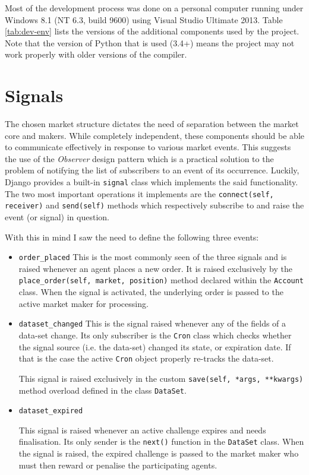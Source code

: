 \documentclass[bsc,frontabs,twoside,singlespacing,parskip,deptreport]{infthesis}     %
\begin{document}
	Most of the development process was done on a personal computer running under Windows 8.1 (NT 6.3, build 9600) using Visual Studio Ultimate 2013. Table \ref{tab:dev-env} lists the versions of the additional components used by the project. Note that the version of Python that is used (3.4+) means the project may not work properly with older versions of the compiler. 

\section{Signals}

	The chosen market structure dictates the need of separation between the market core and makers. While completely independent, these components should be able to communicate effectively in response to various market events. This suggests the use of the {\em Observer} design pattern which is a practical solution to the problem of notifying the list of subscribers to an event of its occurrence. Luckily, Django provides a built-in {\tt signal} class which implements the said functionality. The two most important operations it implements are the {\tt connect(self, receiver)} and {\tt send(self)} methods which respectively subscribe to and raise the event (or signal) in question. 

	With this in mind I saw the need to define the following three events:
\begin{itemize}
\item {\tt order\_placed}
	This is the most commonly seen of the three signals and is raised whenever an agent places a new order. It is raised exclusively by the {\tt place\_order(self, market, position)} method declared within the {\tt Account} class. When the signal is activated, the underlying order is passed to the active market maker for processing. 

\item {\tt dataset\_changed}
	This is the signal raised whenever any of the fields of a data-set change. Its only subscriber is the {\tt Cron} class which checks whether the signal source (i.e. the data-set) changed its state, or expiration date. If that is the case the active {\tt Cron} object properly re-tracks the data-set. 

	This signal is raised exclusively in the custom {\tt save(self, *args, **kwargs)} method overload defined in the class {\tt DataSet}. 

\item {\tt dataset\_expired}

	This signal is raised whenever an active challenge expires and needs finalisation. Its only sender is the {\tt next()} function in the {\tt DataSet} class. When the signal is raised, the expired challenge is passed to the market maker who must then reward or penalise the participating agents. 

\end{itemize}
\end{document}

